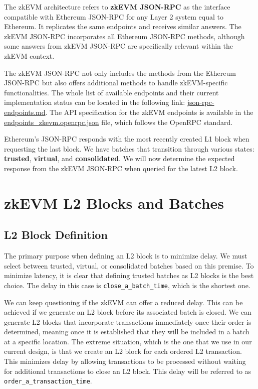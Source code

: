 The zkEVM architecture refers to \textbf{zkEVM JSON-RPC} as the interface compatible with Ethereum JSON-RPC for any Layer 2 system equal to Ethereum. It replicates the same endpoints and receives similar answers. The zkEVM JSON-RPC incorporates all Ethereum JSON-RPC methods, although some answers from zkEVM JSON-RPC are specifically relevant within the zkEVM context.

The zkEVM JSON-RPC not only includes the methods from the Ethereum JSON-RPC but also offers additional methods to handle zkEVM-specific functionalities. The whole list of available endpoints and their current implementation status can be located in the following link: \href{https://github.com/0xPolygonHermez/zkevm-node/blob/develop/docs/json-rpc-endpoints.md}{json-rpc-endpoints.md}. The API specification for the zkEVM endpoints is available in the \href{https://github.com/0xPolygonHermez/zkevm-node/blob/develop/jsonrpc/endpoints_zkevm.openrpc.json}{endpoints\_zkevm.openrpc.json} file, which follows the OpenRPC standard.

Ethereum's JSON-RPC responds with the most recently created L1 block when requesting the last block. We have batches that transition through various states: \textbf{trusted}, \textbf{virtual}, and \textbf{consolidated}. We will now determine the expected response from the zkEVM JSON-RPC when queried for the latest L2 block.





\section{zkEVM L2 Blocks and Batches}


\subsection{L2 Block Definition}

The primary purpose when defining an L2 block is to minimize delay. We must select between trusted, virtual, or consolidated batches based on this premise. To minimize latency, it is clear that defining trusted batches as L2 blocks is the best choice. The delay in this case is \texttt{close\_a\_batch\_time}, which is the shortest one.

We can keep questioning if the zkEVM can offer a reduced delay. This can be achieved if we generate an L2 block before its associated batch is closed. We can generate L2 blocks that incorporate transactions immediately once their order is determined, meaning once it is established that they will be included in a batch at a specific location. The extreme situation, which is the one that we use in our current design, is that we create an L2 block for each ordered L2 transaction. This minimizes delay by allowing transactions to be processed without waiting for additional transactions to close an L2 block. This delay will be referred to as \texttt{order\_a\_transaction\_time}.



